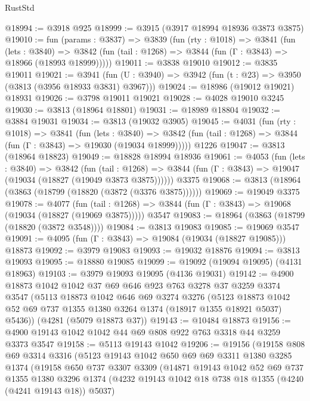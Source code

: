\begin{lexlean}{RustStd}
\begin{coremodule}
@18994 := @3918 @925
@18999 := @3915 (@3917 @18994 @18936 @3873 @3875)
@19010 := fun (params : @3837) =>
  @3839
    (fun (rty : @1018) =>
    @3841
      (fun (lets : @3840) =>
      @3842 (fun (tail : @1268) => @3844 (fun (Γ : @3843) => @18966 (@18993 @18999)))))
@19011 := @3838 @19010
@19012 := @3835 @19011
@19021 := @3941
    (fun (U : @3940) => @3942 (fun (t : @23) => @3950 (@3813 (@3956 @18933 @3831) @3967)))
@19024 := @18986 (@19012 @19021) @18931
@19026 := @3798 @19011 @19021
@19028 := @4028 @19010 @3245
@19030 := @3813 (@18964 @18801)
@19031 := @18989 @18804
@19032 := @3884 @19031
@19034 := @3813 (@19032 @3905)
@19045 := @4031
    (fun (rty : @1018) =>
    @3841
      (fun (lets : @3840) =>
      @3842 (fun (tail : @1268) => @3844 (fun (Γ : @3843) => @19030 (@19034 @18999)))))
    @1226
@19047 := @3813 (@18964 @18823)
@19049 := @18828 @18994 @18936
@19061 := @4053
    (fun (lets : @3840) =>
    @3842
      (fun (tail : @1268) =>
      @3844 (fun (Γ : @3843) => @19047 (@19034 (@18827 (@19049 @3873 @3875))))))
    @3375
@19068 := @3813 (@18964 (@3863 (@18799 (@18820 (@3872 (@3376 @3875))))))
@19069 := @19049 @3375
@19078 := @4077
    (fun (tail : @1268) => @3844 (fun (Γ : @3843) => @19068 (@19034 (@18827 (@19069 @3875)))))
    @3547
@19083 := @18964 (@3863 (@18799 (@18820 (@3872 @3548))))
@19084 := @3813 @19083
@19085 := @19069 @3547
@19091 := @4095 (fun (Γ : @3843) => @19084 (@19034 (@18827 @19085))) @18873
@19092 := @3979 @19083
@19093 := @19032 @18876
@19094 := @3813 @19093
@19095 := @18880 @19085
@19099 := @19092 (@19094 @19095) (@4131 @18963)
@19103 := @3979 @19093 @19095 (@4136 @19031)
@19142 := @4900
    @18873
    @1042
    @1042
    @37
    @69
    @646
    @923
    @763
    @3278
    @37
    @3259
    @3374
    @3547
    (@5113
      @18873
      @1042
      @646
      @69
      @3274
      @3276
      (@5123 @18873 @1042 @52 @69 @737 @1355 @1380 @3264 @1374 (@18917 @1355 @18921 @5037) @5436))
    (@4281 (@5079 @18873 @37))
@19143 := @10484 @18873
@19156 := @4900 @19143 @1042 @1042 @44 @69 @808 @922 @763 @3318 @44 @3259 @3373 @3547
@19158 := @5113 @19143 @1042
@19206 := @19156
    (@19158
      @808
      @69
      @3314
      @3316
      (@5123
        @19143
        @1042
        @650
        @69
        @69
        @3311
        @1380
        @3285
        @1374
        (@19158
          @650
          @737
          @3307
          @3309
          (@14871
            @19143
            @1042
            @52
            @69
            @737
            @1355
            @1380
            @3296
            @1374
            (@4232 @19143 @1042 @18 @738 @18 @1355 (@4240 (@4241 @19143 @18)) @5037)

\end{coremodule}
\end{lexlean}
